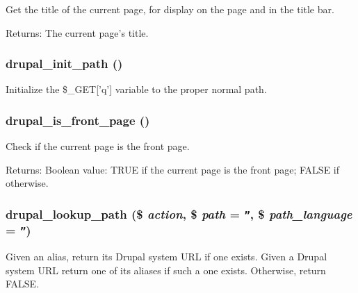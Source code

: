 Get the title of the current page, for display on the page and in the title bar.

\begin{Desc}
\item[Returns:]The current page's title. \end{Desc}
\hypertarget{path_8inc_a48952219ea86162a3ee2ed9376e85cd}{
\subsubsection[{drupal\_\-init\_\-path}]{\setlength{\rightskip}{0pt plus 5cm}drupal\_\-init\_\-path ()}}
\label{path_8inc_a48952219ea86162a3ee2ed9376e85cd}


Initialize the \$\_\-GET\mbox{[}'q'\mbox{]} variable to the proper normal path. \hypertarget{path_8inc_657eb4770879ad6f0dc19bfad2cd4a6d}{
\subsubsection[{drupal\_\-is\_\-front\_\-page}]{\setlength{\rightskip}{0pt plus 5cm}drupal\_\-is\_\-front\_\-page ()}}
\label{path_8inc_657eb4770879ad6f0dc19bfad2cd4a6d}


Check if the current page is the front page.

\begin{Desc}
\item[Returns:]Boolean value: TRUE if the current page is the front page; FALSE if otherwise. \end{Desc}
\hypertarget{path_8inc_0a07f2b00318357e63a351c4973f71c8}{
\subsubsection[{drupal\_\-lookup\_\-path}]{\setlength{\rightskip}{0pt plus 5cm}drupal\_\-lookup\_\-path (\$ {\em action}, \/  \$ {\em path} = {\tt ''}, \/  \$ {\em path\_\-language} = {\tt ''})}}
\label{path_8inc_0a07f2b00318357e63a351c4973f71c8}


Given an alias, return its Drupal system URL if one exists. Given a Drupal system URL return one of its aliases if such a one exists. Otherwise, return FALSE.

